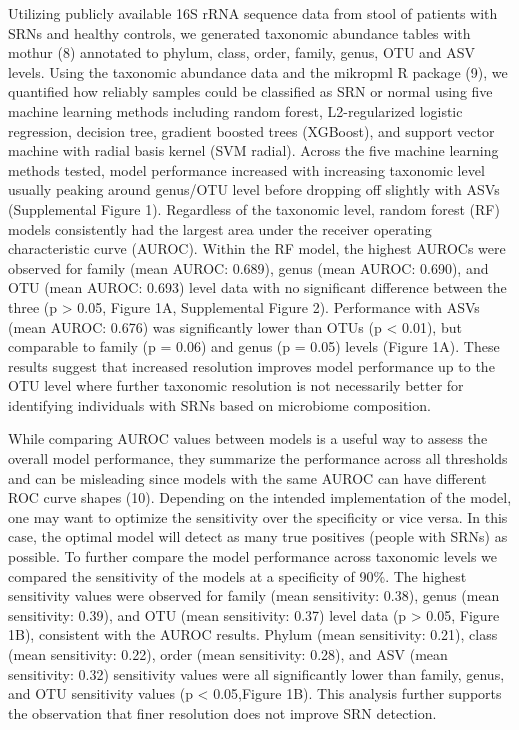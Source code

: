 \documentclass[
]{article}
\begin{document}
Utilizing publicly available 16S rRNA sequence data from stool of
patients with SRNs and healthy controls, we generated taxonomic
abundance tables with mothur (8) annotated to phylum, class, order,
family, genus, OTU and ASV levels. Using the taxonomic abundance data
and the mikropml R package (9), we quantified how reliably samples could
be classified as SRN or normal using five machine learning methods
including random forest, L2-regularized logistic regression, decision
tree, gradient boosted trees (XGBoost), and support vector machine with
radial basis kernel (SVM radial). Across the five machine learning
methods tested, model performance increased with increasing taxonomic
level usually peaking around genus/OTU level before dropping off
slightly with ASVs (Supplemental Figure 1). Regardless of the taxonomic
level, random forest (RF) models consistently had the largest area under
the receiver operating characteristic curve (AUROC). Within the RF
model, the highest AUROCs were observed for family (mean AUROC: 0.689),
genus (mean AUROC: 0.690), and OTU (mean AUROC: 0.693) level data with
no significant difference between the three (p \textgreater{} 0.05,
Figure 1A, Supplemental Figure 2). Performance with ASVs (mean AUROC:
0.676) was significantly lower than OTUs (p \textless{} 0.01), but
comparable to family (p = 0.06) and genus (p = 0.05) levels (Figure 1A).
These results suggest that increased resolution improves model
performance up to the OTU level where further taxonomic resolution is
not necessarily better for identifying individuals with SRNs based on
microbiome composition.

While comparing AUROC values between models is a useful way to assess
the overall model performance, they summarize the performance across all
thresholds and can be misleading since models with the same AUROC can
have different ROC curve shapes (10). Depending on the intended
implementation of the model, one may want to optimize the sensitivity
over the specificity or vice versa. In this case, the optimal model will
detect as many true positives (people with SRNs) as possible. To further
compare the model performance across taxonomic levels we compared the
sensitivity of the models at a specificity of 90\%. The highest
sensitivity values were observed for family (mean sensitivity: 0.38),
genus (mean sensitivity: 0.39), and OTU (mean sensitivity: 0.37) level
data (p \textgreater{} 0.05, Figure 1B), consistent with the AUROC
results. Phylum (mean sensitivity: 0.21), class (mean sensitivity:
0.22), order (mean sensitivity: 0.28), and ASV (mean sensitivity: 0.32)
sensitivity values were all significantly lower than family, genus, and
OTU sensitivity values (p \textless{} 0.05,Figure 1B). This analysis
further supports the observation that finer resolution does not improve
SRN detection.
\end{document}
